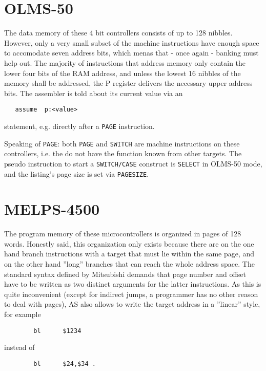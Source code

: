 \documentclass[12pt,twoside]{report}
\newcommand{\tty}[1]{{\tt #1}}
\begin{document}

\section{OLMS-50}

The data memory of these 4 bit controllers consists of up to 128
nibbles.  However, only a very small subset of the machine
instructions have enough space to accomodate seven address bits,
which menas that - once again - banking must help out.  The
majority of instructions that address memory only contain the
lower four bits of the RAM address, and unless the lowest 16
nibbles of the memory shall be addressed, the P register delivers
the necessary upper address bits. The assembler is told about its
current value via an
\begin{verbatim}
   assume  p:<value>
\end{verbatim}
statement, e.g. directly after a \tty{PAGE} instruction.

Speaking of \tty{PAGE}: both \tty{PAGE} and \tty{SWITCH} are
machine instructions on these controllers, i.e. the do not have
the function known from other targets.  The pseudo instruction to
start a \tty{SWITCH/CASE} construct is \tty{SELECT} in OLMS-50
mode, and the listing's page size is set via \tty{PAGESIZE}.


\section{MELPS-4500}

The program memory of these microcontrollers is organized in pages of
128 words.  Honestly said, this organization only exists because there
are on the one hand branch instructions with a target that must lie
within the same page, and on the other hand ''long'' branches that can
reach the whole address space.  The standard syntax defined by
Mitsubishi demands that page number and offset have to be written as
two distinct arguments for the latter instructions.  As this is
quite inconvenient (except for indirect jumps, a programmer has no
other reason to deal with pages), AS also allows to write the target
address in a ''linear'' style, for example
\begin{verbatim}
        bl      $1234
\end{verbatim}
instead of
\begin{verbatim}
        bl      $24,$34 .
\end{verbatim}
\end{document}
